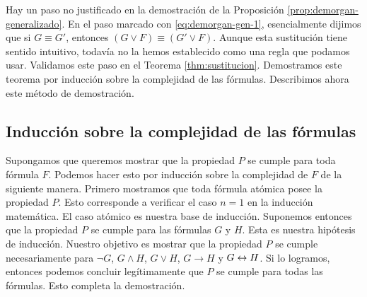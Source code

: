 \documentclass[12pt,a4paper]{book}
\begin{document}
    Hay un paso no justificado en la demostración de la Proposición \ref{prop:demorgan-generalizado}. En el paso marcado con
    \eqref{eq:demorgan-gen-1}, esencialmente dijimos que si $G\equiv G'$, entonces $(G\vee F)\equiv(G'\vee F)$. Aunque esta
    sustitución tiene sentido intuitivo, todavía no la hemos establecido como una regla que podamos usar. Validamos este paso
    en el Teorema \ref{thm:sustitucion}. Demostramos este teorema por inducción sobre la complejidad de las fórmulas.
    Describimos ahora este método de demostración.

    \subsection{Inducción sobre la complejidad de las fórmulas}

    Supongamos que queremos mostrar que la propiedad $P$ se cumple para toda fórmula $F$. Podemos hacer esto por inducción
    sobre la complejidad de $F$ de la siguiente manera. Primero mostramos que toda fórmula atómica posee la propiedad $P$.
    Esto corresponde a verificar el caso $n=1$ en la inducción matemática. El caso atómico es nuestra base de inducción.
    Suponemos entonces que la propiedad $P$ se cumple para las fórmulas $G$ y $H$. Esta es nuestra hipótesis de inducción.
    Nuestro objetivo es mostrar que la propiedad $P$ se cumple necesariamente para $\neg G$, $G\wedge H$, $G\vee H$,
    $G\rightarrow H$ y $G\leftrightarrow H$. Si lo logramos, entonces podemos concluir legítimamente que $P$ se cumple para todas las
    fórmulas. Esto completa la demostración.
\end{document}
